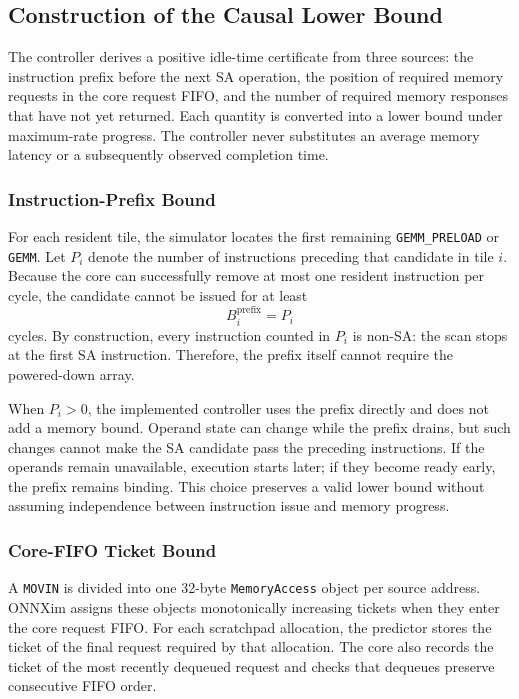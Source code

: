 \subsection{Construction of the Causal Lower Bound}
\label{sec:causal-bound-components}

The controller derives a positive idle-time certificate from three sources:
the instruction prefix before the next SA operation, the position of required
memory requests in the core request FIFO, and the number of required memory
responses that have not yet returned. Each quantity is converted into a lower
bound under maximum-rate progress. The controller never substitutes an
average memory latency or a subsequently observed completion time.

\subsubsection{Instruction-Prefix Bound}

For each resident tile, the simulator locates the first remaining
\texttt{GEMM\_PRELOAD} or \texttt{GEMM}. Let $P_i$ denote the number of
instructions preceding that candidate in tile $i$. Because the core can
successfully remove at most one resident instruction per cycle, the candidate
cannot be issued for at least
\begin{equation}
  B^{\mathrm{prefix}}_i=P_i
  \label{eq:prefix-bound}
\end{equation}
cycles. By construction, every instruction counted in $P_i$ is non-SA: the
scan stops at the first SA instruction. Therefore, the prefix itself cannot
require the powered-down array.

When $P_i>0$, the implemented controller uses the prefix directly and does
not add a memory bound. Operand state can change while the prefix drains, but
such changes cannot make the SA candidate pass the preceding instructions.
If the operands remain unavailable, execution starts later; if they become
ready early, the prefix remains binding. This choice preserves a valid lower
bound without assuming independence between instruction issue and memory
progress.

\subsubsection{Core-FIFO Ticket Bound}

A \texttt{MOVIN} is divided into one 32-byte \texttt{MemoryAccess} object per
source address. ONNXim assigns these objects monotonically increasing tickets
when they enter the core request FIFO. For each scratchpad allocation, the
predictor stores the ticket of the final request required by that allocation.
The core also records the ticket of the most recently dequeued request and
checks that dequeues preserve consecutive FIFO order.

